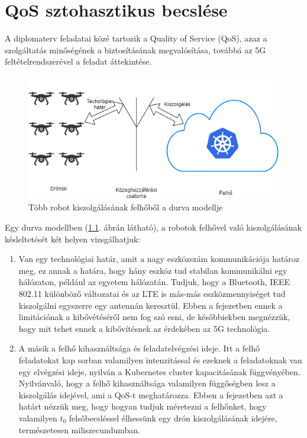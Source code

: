 \chapter{QoS sztohasztikus becslése}
\label{cha:toki}
A diplomaterv feladatai közé tartozik a Quality of Service (QoS), azaz a szolgáltatás minőségének a biztosításának megvalósítása, továbbá az 5G feltételrendszerével a feladat áttekintése.
\begin{figure}
	\centering
	\includegraphics[width=\linewidth]{figures/qos.png}
	\caption{Több robot kiszolgálásának felhőből a durva modellje}
	\label{fig:qos}
\end{figure}
Egy durva modellben (\ref{fig:qos}. ábrán látható), a robotok felhővel való kiszolgálásának késleltetését két helyen vizsgálhatjuk:
\begin{enumerate}
\item Van egy technológiai határ, amit a nagy eszközszám kommunikációja határoz meg, ez annak a határa, hogy hány eszköz tud stabilan kommunikálni egy hálózaton, például az egyetem hálózatán. Tudjuk, hogy a Bluetooth, IEEE 802.11 különböző változatai és az LTE is más-más eszközmennyiséget tud kiszolgálni egyszerre egy antennán keresztül. Ebben a fejezetben ennek a limitációnak a kibővétéséről nem fog szó esni, de későbbiekben megnézzük, hogy mit tehet ennek a kibővítésnek az érdekében az 5G technológia.
\item A másik a felhő kihasználtsága és feladatelvégzési ideje. Itt a felhő feladatokat kap sorban valamilyen intenzitással és ezeknek a feladatoknak van egy elvégzési ideje, nyilván a Kubernetes cluster kapacitásának függvényében. Nyilvánvaló, hogy a felhő kihasználtsága valamilyen függőségben lesz a kiszolgálás idejével, ami a QoS-t meghatározza. Ebben a fejezetben azt a határt nézzük meg, hogy hogyan tudjuk méretezni a felhőnket, hogy valamilyen $t_0$ felsőbecsléssel élhessünk egy drón kiszolgálásának idejére, természetesen miliszecundumban.
\end{enumerate}

